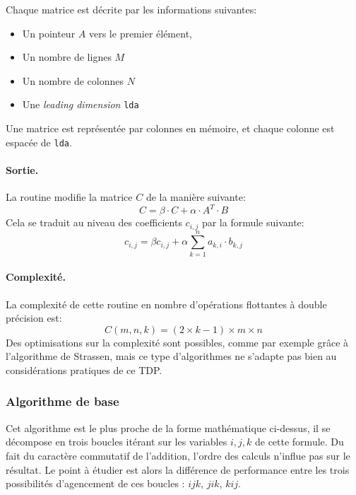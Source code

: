 Chaque matrice est décrite par les informations suivantes:
\begin{itemize}
\item Un pointeur $A$ vers le premier élément,
\item Un nombre de lignes $M$
\item Un nombre de colonnes $N$
\item Une \textit{leading dimension} \texttt{lda}
\end{itemize}
Une matrice est représentée par colonnes en mémoire, et chaque colonne est espacée de \texttt{lda}.


\paragraph{Sortie.} La routine modifie la matrice $C$ de la manière suivante:
\begin{equation}
C=\beta \cdot C + \alpha \cdot A^T \cdot B 
\end{equation}
Cela se traduit au niveau des coefficients $c_{i,j}$ par la formule suivante:
\begin{equation}
c_{i,j} = \beta c_{i,j} + \alpha \sum\limits_{k=1}^n a_{k,i} \cdot b_{k,j}
\end{equation}


\paragraph{Complexité.} La complexité de cette routine en nombre d'opérations flottantes à double précision est:
\begin{equation}
C(m,n,k)=(2\times k-1)\times m\times n
\end{equation}
Des optimisations sur la complexité sont possibles, comme par exemple grâce à l'algorithme de Strassen, mais ce type d'algorithmes ne s'adapte pas bien au considérations pratiques de ce TDP.


\subsubsection{Algorithme de base}

Cet algorithme est le plus proche de la forme mathématique ci-dessus, il se décompose en trois boucles itérant sur les variables $i,j,k$ de cette formule. Du fait du caractère commutatif de l'addition, l'ordre des calculs n'influe pas sur le résultat. Le point à étudier est alors la différence de performance entre les trois possibilités d'agencement de ces boucles : $ijk$, $jik$, $kij$.

